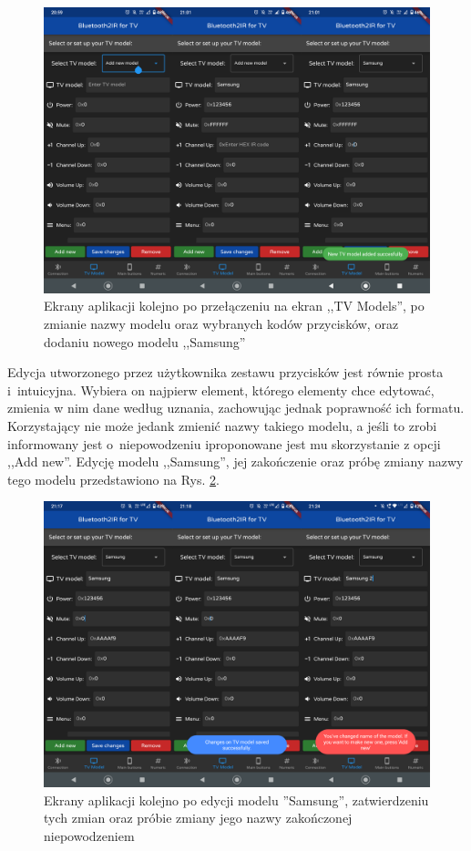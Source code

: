 \documentclass[12pt,twoside]{article}
\begin{document}
\begin{figure}[ht]
   \centering
   \includegraphics[width=15cm]{images/addingSamsung.png}
   \caption{Ekrany aplikacji kolejno po przełączeniu na ekran ,,TV Models'', po zmianie nazwy modelu oraz wybranych kodów przycisków, oraz dodaniu nowego modelu ,,Samsung''}
   \label{Fig:addingSamsung}
\end{figure}

Edycja utworzonego przez użytkownika zestawu przycisków jest równie prosta i~intuicyjna. Wybiera on najpierw element, którego elementy chce edytować, zmienia w nim dane według uznania, zachowując jednak poprawność ich formatu. Korzystający nie może jedank zmienić nazwy takiego modelu, a jeśli to zrobi informowany jest o~niepowodzeniu iproponowane jest mu skorzystanie z opcji ,,Add new''. Edycję modelu ,,Samsung'', jej zakończenie oraz  próbę zmiany nazwy tego modelu przedstawiono na Rys. \ref*{Fig:changingSamsung}.

\begin{figure}[ht]
   \centering
   \includegraphics[width=15cm]{images/changingSamsung.png}
   \caption{Ekrany aplikacji kolejno po edycji modelu ''Samsung'', zatwierdzeniu tych zmian oraz próbie zmiany jego nazwy zakończonej niepowodzeniem}
   \label{Fig:changingSamsung}
\end{figure}
\end{document}

